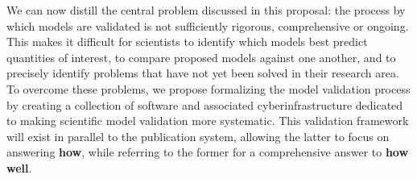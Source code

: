 \documentclass[a4paper,12pt]{article}
\begin{document}
We can now distill the central problem discussed in this proposal: the process by which models are validated is not sufficiently rigorous, comprehensive or ongoing. This makes it difficult for scientists to identify which models best predict quantities of interest, to compare proposed models against one another, and to precisely identify problems that have not yet been solved in their research area. To overcome these problems, we propose formalizing the model validation process by creating a collection of software and associated cyberinfrastructure dedicated to making scientific model validation more systematic.  This validation framework will exist in parallel to the publication system, allowing the latter to focus on answering \textbf{how}, while referring to the former for a comprehensive answer to \textbf{how well}. 
\end{document}
